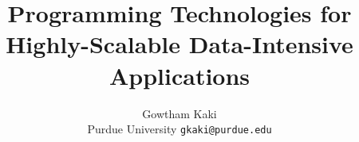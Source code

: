 \documentclass[11pt]{article}
\date{}
\begin{document}
\title{\color{Black} Programming Technologies for Highly-Scalable Data-Intensive Applications}

\author{Gowtham Kaki \\ \small{Purdue University} \hspace*{0.1in}
  \small{{\tt gkaki@purdue.edu}} }

\maketitle




{
}


\small

\end{document}

